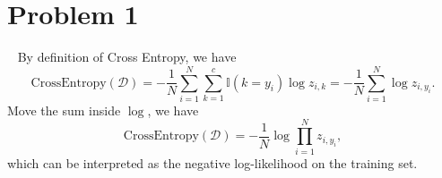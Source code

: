 \section{Problem 1}~\label{sec:prob1}
By definition of Cross Entropy, we have
\begin{equation}
    \text{CrossEntropy}(\mathcal{D}) =
        -\frac{1}{N}\sum_{i=1}^{N}\sum_{k=1}^c \mathbb{I}(k=y_i)\log{z_{i,k}}
    =-\frac{1}{N}\sum_{i=1}^{N}\log{z_{i,y_i}}.
\end{equation}
Move the sum inside $\log$, we have
\begin{equation}
    \text{CrossEntropy}(\mathcal{D}) =
    -\frac{1}{N}\log{\prod_{i=1}^{N}z_{i,y_i}},
\end{equation}
which can be interpreted as the negative log-likelihood on the training set.
